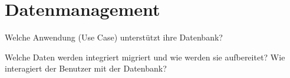 \section{Datenmanagement}
Welche Anwendung (Use Case) unterstützt ihre Datenbank?

Welche Daten werden integriert migriert
 und wie werden sie 
aufbereitet?
Wie interagiert der Benutzer mit der Datenbank?